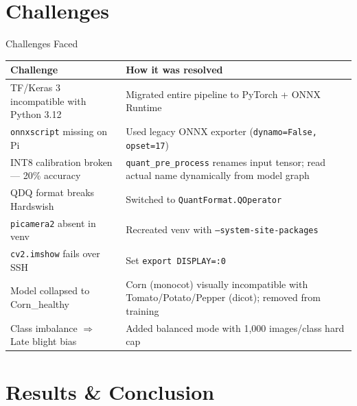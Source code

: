 \documentclass[aspectratio=169]{beamer}
\begin{document}
\section{Challenges}

\begin{frame}{Challenges Faced}
  \begin{tabular}{p{4.5cm} p{7cm}}
    \toprule
    \textbf{Challenge} & \textbf{How it was resolved} \\
    \midrule
    TF/Keras 3 incompatible with Python 3.12 &
      Migrated entire pipeline to PyTorch + ONNX Runtime \\[4pt]
    \texttt{onnxscript} missing on Pi &
      Used legacy ONNX exporter (\texttt{dynamo=False, opset=17}) \\[4pt]
    INT8 calibration broken — 20\% accuracy &
      \texttt{quant\_pre\_process} renames input tensor; read actual name dynamically from model graph \\[4pt]
    QDQ format breaks Hardswish &
      Switched to \texttt{QuantFormat.QOperator} \\[4pt]
    \texttt{picamera2} absent in venv &
      Recreated venv with \texttt{--system-site-packages} \\[4pt]
    \texttt{cv2.imshow} fails over SSH &
      Set \texttt{export DISPLAY=:0} \\[4pt]
    Model collapsed to Corn\_healthy &
      Corn (monocot) visually incompatible with Tomato/Potato/Pepper (dicot); removed from training \\[4pt]
    Class imbalance $\Rightarrow$ Late blight bias &
      Added balanced mode with 1,000 images/class hard cap \\
    \bottomrule
  \end{tabular}
\end{frame}

\section{Results \& Conclusion}
\end{document}
